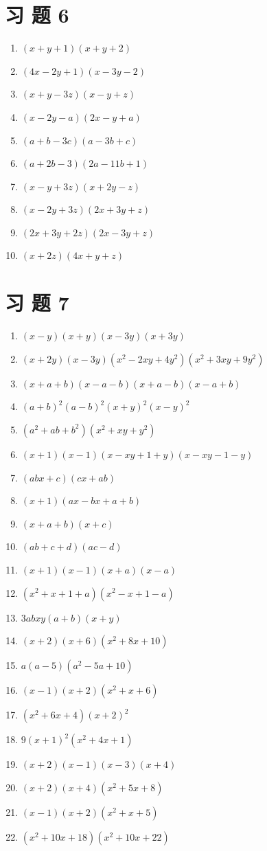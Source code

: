 \documentclass[10pt]{article}
\begin{document}
\section*{习 题 6}
\begin{enumerate}
  \item $(x+y+1)(x+y+2)$
  \item $(4 x-2 y+1)(x-3 y-2)$
  \item $(x+y-3 z)(x-y+z)$
  \item $(x-2 y-a)(2 x-y+a)$
  \item $(a+b-3 c)(a-3 b+c)$
  \item $(a+2 b-3)(2 a-11 b+1)$
  \item $(x-y+3 z)(x+2 y-z)$
  \item $(x-2 y+3 z)(2 x+3 y+z)$
  \item $(2 x+3 y+2 z)(2 x-3 y+z)$
  \item $(x+2 z)(4 x+y+z)$
\end{enumerate}

\section*{习 题 7}
\begin{enumerate}
  \item $(x-y)(x+y)(x-3 y)(x+3 y)$
  \item $(x+2 y)(x-3 y)\left(x^{2}-2 x y+4 y^{2}\right)\left(x^{2}+3 x y+9 y^{2}\right)$
  \item $(x+a+b)(x-a-b)(x+a-b)(x-a+b)$
  \item $(a+b)^{2}(a-b)^{2}(x+y)^{2}(x-y)^{2}$
  \item $\left(a^{2}+a b+b^{2}\right)\left(x^{2}+x y+y^{2}\right)$
  \item $(x+1)(x-1)(x-x y+1+y)(x-x y-1-y)$
  \item $(a b x+c)(c x+a b)$
  \item $(x+1)(a x-b x+a+b)$
  \item $(x+a+b)(x+c)$
  \item $(a b+c+d)(a c-d)$
  \item $(x+1)(x-1)(x+a)(x-a)$
  \item $\left(x^{2}+x+1+a\right)\left(x^{2}-x+1-a\right)$
  \item $3 a b x y(a+b)(x+y)$
  \item $(x+2)(x+6)\left(x^{2}+8 x+10\right)$
  \item $a(a-5)\left(a^{2}-5 a+10\right)$
  \item $(x-1)(x+2)\left(x^{2}+x+6\right)$
  \item $\left(x^{2}+6 x+4\right)(x+2)^{2}$
  \item $9(x+1)^{2}\left(x^{2}+4 x+1\right)$
  \item $(x+2)(x-1)(x-3)(x+4)$
  \item $(x+2)(x+4)\left(x^{2}+5 x+8\right)$
  \item $(x-1)(x+2)\left(x^{2}+x+5\right)$
  \item $\left(x^{2}+10 x+18\right)\left(x^{2}+10 x+22\right)$
\end{enumerate}
\end{document}
